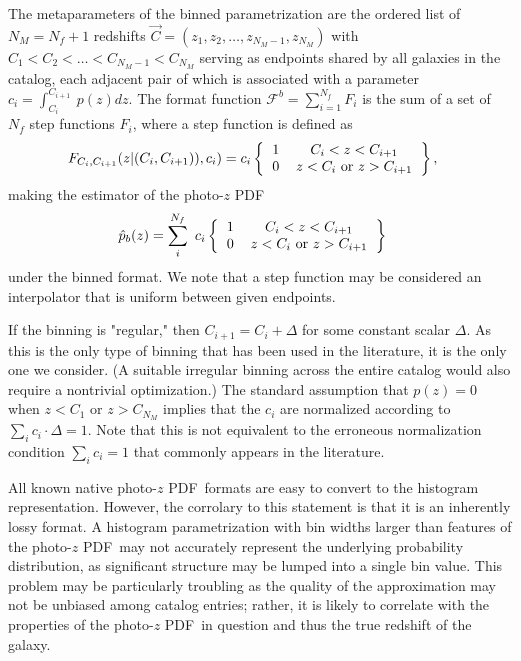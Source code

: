 \documentclass[\docopts]{\docclass}
\newcommand{\pz}{photo-$z$ PDF}
\begin{document}
The metaparameters of the binned parametrization are the ordered list of 
$N_{M}=N_{f}+1$ redshifts $\vec{C} = (z_{1}, z_{2}, \dots, z_{N_{M}-1}, 
z_{N_{M}})$ with $C_{1} < C_{2} < \dots < C_{N_{M}-1} < C_{N_{M}}$ serving as 
endpoints shared by all galaxies in the catalog, each adjacent pair of which is 
associated with a parameter $c_{i}=\int_{C_{i}}^{C_{i+1}}\ p(z)dz$.  The format 
function $\mathcal{F}^{b}=\sum_{i=1}^{N_{f}}F_{i}$ is the sum of a set of 
$N_{f}$ step functions $F_{i}$, where a step function is defined as
\begin{align}
  \label{eq:step}
  F_{C_{i}, C_{i+1}}(z| (C_{i}, C_{i+1})), c_{i}) &= c_{i} 
\left\{\begin{tabular}{cc}$1$&$C_{i}<z<C_{i+1}$\\
0&$z < C_{i}$\ or\ $z > C_{i+1}$\end{tabular}\right\},
\end{align}
making the estimator of the \pz\
\begin{align}
  \label{eq:binned}
  \hat{p}_{b}(z) &= \sum_{i}^{N_{f}}\ c_{i} 
\left\{\begin{tabular}{cc}$1$&$C_{i}<z<C_{i+1}$\\
0&$z < C_{i}$\ or\ $z > C_{i+1}$\end{tabular}\right\}
\end{align}
under the binned format.  We note that a step function may be considered an 
interpolator that is uniform between given endpoints.

If the binning is "regular," then $C_{i+1}=C_{i}+\Delta$ for some constant 
scalar $\Delta$.  As this is the only type of binning that has been used in the 
literature, it is the only one we consider.  (A suitable irregular binning 
across the entire catalog would also require a nontrivial optimization.)  The 
standard assumption that $p(z)=0$ when $z<C_{1}$ or $z>C_{N_{M}}$ implies that 
the $c_{i}$ are normalized according to $\sum_{i} c_{i}\cdot\Delta = 1$.  Note 
that this is not equivalent to the erroneous normalization condition $\sum_{i} 
c_{i} = 1$ that commonly appears in the literature.

All known native \pz\ formats are easy to convert to the histogram 
representation.  However, the corrolary to this statement is that it is an 
inherently lossy format.  A histogram parametrization with bin widths larger 
than features of the \pz\ may not accurately represent the underlying 
probability distribution, as significant structure may be lumped into a single 
bin value.  This problem may be particularly troubling as the quality of the 
approximation may not be unbiased among catalog entries; rather, it is likely 
to correlate with the properties of the \pz\ in question and thus the true 
redshift of the galaxy.
\end{document}
